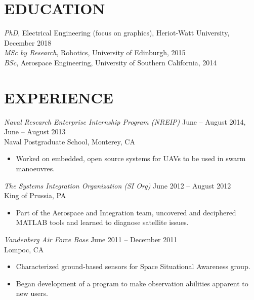\documentclass[10pt]{res} %
\begin{document}
\begin{resume}

\section{EDUCATION} 

{\sl PhD}, Electrical Engineering (focus on graphics), Heriot-Watt University, December 2018\\
\emph{MSc by Research}, Robotics, University of Edinburgh, 2015\\ 
\emph{BSc}, Aerospace Engineering, University of Southern California, 2014 


\section{EXPERIENCE}

{\sl Naval Research Enterprise Internship Program (NREIP)} \hfill June -- August 2014, June -- August 2013 \\
Naval Postgraduate School, Monterey, CA
\begin{itemize} \itemsep -2pt %
\item Worked on embedded, open source systems for UAVs to be used in swarm manoeuvres.  
\end{itemize}

{\sl The Systems Integration Organization (SI Org)}
\hfill June 2012 -- August 2012 \\
King of Prussia, PA 
\begin{itemize} \itemsep -2pt %
\item Part of the Aerospace and Integration team, uncovered and deciphered MATLAB tools and learned to diagnose satellite issues.
\end{itemize} 

{\sl Vandenberg Air Force Base} 
\hfill June 2011 -- December 2011 \\ 
Lompoc, CA
\begin{itemize}\itemsep -2pt
\item Characterized ground-based sensors for Space Situational Awareness group.
\item Began development of a program to make observation abilities apparent to new users.
\end{itemize}


\end{resume}
\end{document}
